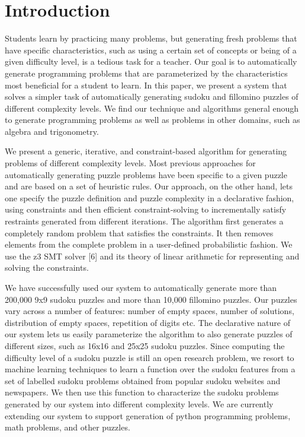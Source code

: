 \section{Introduction}

Students learn by practicing many problems, but generating fresh problems that have specific characteristics, such as using a certain set of concepts or being of a given difficulty level, is a
tedious task for a teacher. Our goal is to automatically generate programming problems that are parameterized by the characteristics most beneficial for a student to learn. In this paper, we present a system that solves a simpler task of automatically generating sudoku and fillomino puzzles of different complexity levels. We find our technique and algorithms general enough to generate programming problems as well as problems in other domains, such as algebra and trigonometry.

We present a generic, iterative, and constraint-based algorithm for generating problems of different complexity levels. Most previous approaches for automatically generating puzzle problems have been specific to a given puzzle and are based on a set of heuristic rules. Our approach, on the other hand, lets one specify the puzzle definition and puzzle complexity in a declarative fashion, using constraints and then efficient constraint-solving to incrementally satisfy restraints generated from different iterations. The algorithm first generates a completely random problem that satisfies the constraints. It then removes elements from the complete problem in a user-defined probabilistic fashion. We use the z3 SMT solver [6] and its theory of linear arithmetic for representing and solving the constraints.

We have successfully used our system to automatically generate more than 200,000 9x9 sudoku puzzles and more than 10,000 fillomino puzzles. Our puzzles vary across a number of features: number of empty spaces, number of solutions, distribution of empty spaces, repetition of digits etc. The declarative nature of our system lets us easily parameterize the algorithm to also generate puzzles of different sizes, such as 16x16 and 25x25 sudoku puzzles. Since computing the difficulty level of a sudoku puzzle is still an open research problem, we resort to machine learning techniques to learn a function over the sudoku features from a set of labelled sudoku problems obtained from popular sudoku websites and newspapers. We then use this function to characterize the sudoku problems generated by our system into different complexity levels. We are currently extending our system to support generation of python programming problems, math problems, and other puzzles.
